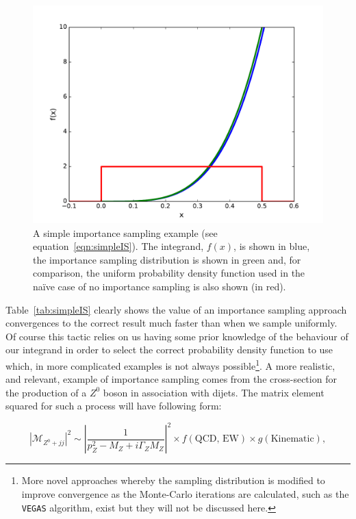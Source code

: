 	\begin{figure}[hbt]
		\includegraphics[width=\textwidth]{importanceSampling}
		\caption{A simple importance sampling example (see equation~\eqref{eqn:simpleIS}).  The integrand, $f(x)$, is shown in blue,
		the importance sampling distribution is shown in green and, for comparison, the uniform probability density function used
		in the na\"ive case of no importance sampling is also shown (in red).}
		\label{fig:simpleIS}
  	\end{figure}

  	Table~\eqref{tab:simpleIS} clearly shows the value of an importance sampling approach convergences to the correct result
  	much faster than when we sample uniformly. Of course this tactic relies on us having some prior knowledge of the behaviour of our
  	integrand in order to select the correct probability density function to use which, in more complicated examples is not always
  	possible\footnote{More novel approaches whereby the sampling distribution is modified to improve convergence as the Monte-Carlo
  	iterations are calculated, such as the \texttt{VEGAS} algorithm,
  	exist but they will not be discussed here.}. A more realistic, and relevant, example of importance sampling comes from the
  	cross-section for the production of a $Z^0$ boson in association with dijets.  The matrix element squared for such a process
  	will have following form:

  	\begin{equation}
  		|\mathcal{M}_{Z^0+jj}|^2 \sim \left|\frac{1}{p_Z^2 - M_Z + i\Gamma_ZM_Z}\right|^2\times f(\text{QCD, EW})\times g(\text{Kinematic}),
  		\label{eqn:schematicZ}
  	\end{equation}


